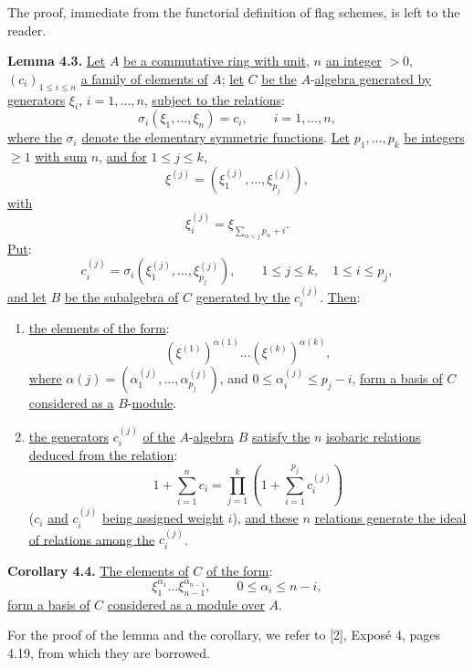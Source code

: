 The proof, immediate from the functorial definition of flag schemes, is left to the reader.

\textbf{Lemma 4.3.} \uline{Let} \(A\) \uline{be a commutative ring with unit}, \(n\) \uline{an integer} \(>0\), \((c_i)_{1\le i\le n}\) \uline{a family of elements of} \(A\); \uline{let} \(C\) \uline{be the} \(A\)-\uline{algebra generated by generators} \(\xi_i\), \(i=1,\ldots,n\), \uline{subject to the relations}:
\[
  \sigma_i(\xi_1,\ldots,\xi_n)=c_i,
  \qquad i=1,\ldots,n,
\]
\uline{where the} \(\sigma_i\) \uline{denote the elementary symmetric functions}. \uline{Let} \(p_1,\ldots,p_k\) \uline{be integers} \(\geq1\) \uline{with sum} \(n\), \uline{and for} \(1\le j\le k\),
\[
  \xi^{(j)}=(\xi_1^{(j)},\ldots,\xi_{p_j}^{(j)}),
\]
\uline{with}
\[
  \xi_i^{(j)}=\xi_{\sum_{\alpha<j}p_\alpha+i}.
\]
\uline{Put}:
\[
  c_i^{(j)}=\sigma_i(\xi_1^{(j)},\ldots,\xi_{p_j}^{(j)}),
  \qquad 1\le j\le k,
  \quad 1\le i\le p_j,
\]
\uline{and let} \(B\) \uline{be the subalgebra of} \(C\) \uline{generated by the} \(c_i^{(j)}\). \uline{Then}:
\begin{enumerate}[label=\textup{\roman*)}]
\item \uline{the elements of the form}:
\[
  (\xi^{(1)})^{\alpha(1)}\ldots (\xi^{(k)})^{\alpha(k)},
\]
\uline{where} \(\alpha(j)=(\alpha_1^{(j)},\ldots,\alpha_{p_j}^{(j)})\), and \(0\le \alpha_i^{(j)}\le p_j-i\), \uline{form a basis of} \(C\) \uline{considered as a} \(B\)-\uline{module}.
\item \uline{the generators} \(c_i^{(j)}\) \uline{of the} \(A\)-\uline{algebra} \(B\) \uline{satisfy the} \(n\) \uline{isobaric relations deduced from the relation}:
\[
  1+\sum_{i=1}^{n}c_i=\prod_{j=1}^{k}\left(1+\sum_{i=1}^{p_j}c_i^{(j)}\right)
\]
%
(\(c_i\) \uline{and} \(c_i^{(j)}\) \uline{being assigned weight} \(i\)), \uline{and these} \(n\) \uline{relations generate the ideal of relations among the} \(c_i^{(j)}\).
\end{enumerate}

\textbf{Corollary 4.4.} \uline{The elements of} \(C\) \uline{of the form}:
\[
  \xi_1^{\alpha_1}\ldots\xi_{n-1}^{\alpha_{n-1}},
  \qquad 0\le\alpha_i\le n-i,
\]
\uline{form a basis of} \(C\) \uline{considered as a module over} \(A\).

For the proof of the lemma and the corollary, we refer to [2], Exposé 4, pages 4.19, from which they are borrowed.


